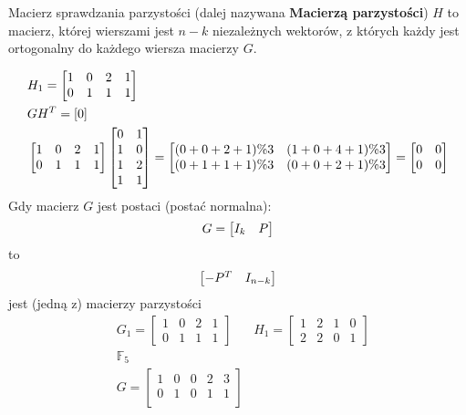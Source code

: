 \begin{definition}
Macierz sprawdzania parzystości (dalej nazywana \textbf{Macierzą parzystości}) $H$ to macierz, której wierszami jest $n-k$ niezależnych wektorów, z których każdy jest ortogonalny do każdego wiersza macierzy $G$.
\end{definition}
\begin{example*}
\begin{align*}
&H_1=\begin{bmatrix}
1&0&2&1\\0&1&1&1
\end{bmatrix}\\
&GH^T=[ {\Huge 0}]\\
&\begin{bmatrix}
1&0&2&1\\0&1&1&1
\end{bmatrix}\begin{bmatrix}
0&1\\1&0\\1&2\\1&1
\end{bmatrix}=\begin{bmatrix}
(0+0+2+1)\%3 & (1+0+4+1)\%3\\
(0+1+1+1)\%3 & (0+0+2+1)\%3 
\end{bmatrix}=\begin{bmatrix}
0&0\\
0&0
\end{bmatrix}
\end{align*}
Gdy macierz $G$ jest postaci (postać normalna):
$$G=\begin{bmatrix}
{\Huge I_k}& {\Huge P}
\end{bmatrix}$$
to
$$\begin{bmatrix}
{\Huge -P^T} & {\Huge I_{n-k}}
\end{bmatrix}$$ jest (jedną z) macierzy parzystości
\begin{align*}
&G_1=\begin{bmatrix}
1&0&2&1\\0&1&1&1
\end{bmatrix} & H_1=\begin{bmatrix}
1&2&1&0\\2&2&0&1
\end{bmatrix}\\
&\mathbb{F}_5\\
&G=\begin{bmatrix}
1&0&0&2&3\\
0&1&0&1&1\\

\end{bmatrix}
\end{align*}
\end{example*}
